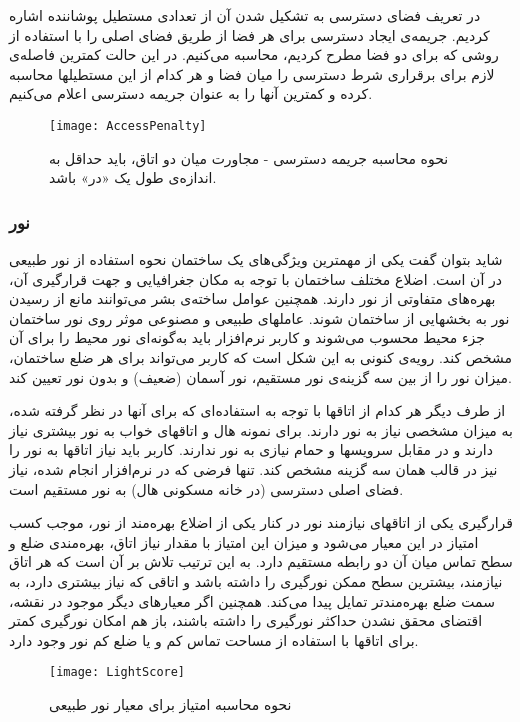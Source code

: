 \documentclass{report}
\begin{document}
در تعریف فضای دسترسی به تشکیل شدن آن از تعدادی مستطیل پوشاننده اشاره کردیم. جریمه‌ی ایجاد دسترسی برای هر فضا از طریق فضای اصلی را با استفاده از روشی که برای دو فضا مطرح کردیم، محاسبه می‌کنیم. در این حالت کمترین فاصله‌ی لازم برای برقراری شرط دسترسی را میان فضا و هر کدام از این مستطیلها محاسبه کرده و کمترین آنها را به عنوان جریمه دسترسی اعلام می‌کنیم.

\begin{figure} \centerline{\texttt{[image: AccessPenalty]}} \caption{\label{fAccessPenalty}
نحوه محاسبه جریمه دسترسی - مجاورت میان دو اتاق، باید حداقل به اندازه‌ی طول یک «در» باشد.
 } \end{figure}

\subsubsection{نور}
شاید بتوان گفت یکی از مهمترین ویژگی‌های یک ساختمان نحوه استفاده از نور طبیعی در آن است. اضلاع مختلف ساختمان با توجه به مکان جغرافیایی و جهت قرارگیری آن، بهره‌های متفاوتی از نور دارند. همچنین عوامل ساخته‌ی بشر می‌توانند مانع از رسیدن نور به بخشهایی از ساختمان شوند. عاملهای طبیعی و مصنوعی موثر روی نور ساختمان جزء محیط محسوب می‌شوند و کاربر نرم‌افزار باید به‌گونه‌ای نور محیط را برای آن مشخص کند. رویه‌ی کنونی به این شکل است که کاربر می‌تواند برای هر ضلع ساختمان، میزان نور را از بین سه گزینه‌ی نور مستقیم، نور آسمان (ضعیف) و بدون نور تعیین کند.

از طرف دیگر هر کدام از اتاقها با توجه به استفاده‌ای که برای آنها در نظر گرفته شده، به میزان مشخصی نیاز به نور دارند. برای نمونه هال و اتاقهای خواب به نور بیشتری نیاز دارند و در مقابل سرویسها و حمام نیازی به نور ندارند. کاربر باید نیاز اتاقها به نور را نیز در قالب همان سه گزینه مشخص کند. تنها فرضی که در نرم‌افزار انجام شده، نیاز فضای اصلی دسترسی (در خانه مسکونی هال) به نور مستقیم است.

قرارگیری یکی از اتاقهای نیازمند نور در کنار یکی از اضلاع بهره‌مند از نور، موجب کسب امتیاز در این معیار می‌شود و میزان این امتیاز با مقدار نیاز اتاق، بهره‌مندی ضلع و سطح تماس میان آن دو رابطه مستقیم دارد. به این ترتیب تلاش بر آن است که هر اتاق نیازمند، بیشترین سطح ممکن نورگیری را داشته باشد و اتاقی که نیاز بیشتری دارد، به سمت ضلع بهره‌مندتر تمایل پیدا می‌کند. همچنین اگر معیارهای دیگر موجود در نقشه، اقتضای محقق نشدن حداکثر نورگیری را داشته باشند، باز هم امکان نورگیری کمتر برای اتاقها با استفاده از مساحت تماس کم و یا ضلع کم نور وجود دارد.

\begin{figure} \centerline{\texttt{[image: LightScore]}} \caption{\label{fLightScore}
نحوه محاسبه امتیاز برای معیار نور طبیعی
 } \end{figure}
\end{document}
